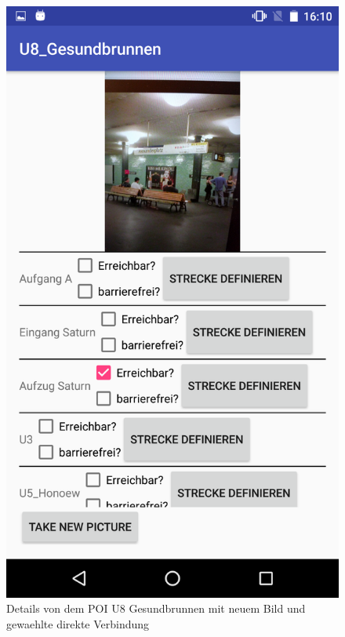 \documentclass{article}
\begin{document}
\begin{figure}[H]
	\centering
	\includegraphics[scale=0.18]{images/poi_gesundbrunnen_picture_taken.png}
	\caption{Details von dem POI U8 Gesundbrunnen mit neuem Bild und gewaehlte direkte Verbindung}
	\label{fig:poi_gesundbrunnen_picture_taken}
\end{figure}
\end{document}
